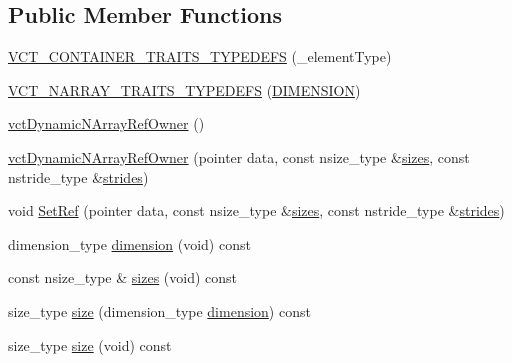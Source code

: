 \subsection*{Public Member Functions}
\begin{DoxyCompactItemize}
\item 
\hyperlink{classvct_dynamic_n_array_ref_owner_ae30da698c308bc111e045b687e727fe7}{V\+C\+T\+\_\+\+C\+O\+N\+T\+A\+I\+N\+E\+R\+\_\+\+T\+R\+A\+I\+T\+S\+\_\+\+T\+Y\+P\+E\+D\+E\+F\+S} (\+\_\+element\+Type)
\item 
\hyperlink{classvct_dynamic_n_array_ref_owner_ad0078ba87c8ae67f68d4fbb64f1e7999}{V\+C\+T\+\_\+\+N\+A\+R\+R\+A\+Y\+\_\+\+T\+R\+A\+I\+T\+S\+\_\+\+T\+Y\+P\+E\+D\+E\+F\+S} (\hyperlink{classvct_dynamic_n_array_ref_owner_a80e01cf6b29f06f8909c10a950de8878a189e6a50792859079c88592f0c2ab19b}{D\+I\+M\+E\+N\+S\+I\+O\+N})
\item 
\hyperlink{classvct_dynamic_n_array_ref_owner_a6e49b5e70c0f7d8a6f02d75a705d4ec5}{vct\+Dynamic\+N\+Array\+Ref\+Owner} ()
\item 
\hyperlink{classvct_dynamic_n_array_ref_owner_a67e4c69b9e69c4d580fddfac23fb2d01}{vct\+Dynamic\+N\+Array\+Ref\+Owner} (pointer data, const nsize\+\_\+type \&\hyperlink{classvct_dynamic_n_array_ref_owner_a97f28bacda75aa99b650610c81e5e38b}{sizes}, const nstride\+\_\+type \&\hyperlink{classvct_dynamic_n_array_ref_owner_ac7334601eafc3a0ec9d7801ade2fbf6f}{strides})
\item 
void \hyperlink{classvct_dynamic_n_array_ref_owner_aedba684cf915850bbbcfe5bb976b5a6a}{Set\+Ref} (pointer data, const nsize\+\_\+type \&\hyperlink{classvct_dynamic_n_array_ref_owner_a97f28bacda75aa99b650610c81e5e38b}{sizes}, const nstride\+\_\+type \&\hyperlink{classvct_dynamic_n_array_ref_owner_ac7334601eafc3a0ec9d7801ade2fbf6f}{strides})
\item 
dimension\+\_\+type \hyperlink{classvct_dynamic_n_array_ref_owner_ade9ee32661cd3ff7408e93b15ba7e1db}{dimension} (void) const 
\item 
const nsize\+\_\+type \& \hyperlink{classvct_dynamic_n_array_ref_owner_a97f28bacda75aa99b650610c81e5e38b}{sizes} (void) const 
\item 
size\+\_\+type \hyperlink{classvct_dynamic_n_array_ref_owner_ae02036d7af57fbae121a822f369fb92a}{size} (dimension\+\_\+type \hyperlink{classvct_dynamic_n_array_ref_owner_ade9ee32661cd3ff7408e93b15ba7e1db}{dimension}) const 
\item 
size\+\_\+type \hyperlink{classvct_dynamic_n_array_ref_owner_a1a3a3e3120ad932a59eb278e852c57f4}{size} (void) const 

\end{DoxyCompactItemize}
